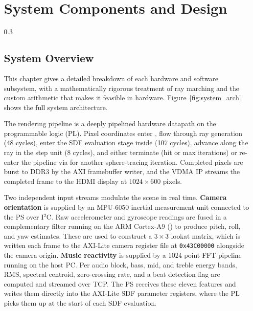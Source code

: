 \chapter{System Components and Design}
\label{ch2}

\begin{spacing}{0.3}
\minitoc
\end{spacing}

\thesisspacing


\section{System Overview}

This chapter gives a detailed breakdown of each hardware and software subsystem,
with a mathematically rigorous treatment of ray marching and the custom
arithmetic that makes it feasible in hardware. Figure~\ref{fig:system_arch}
shows the full system architecture.

The rendering pipeline is a deeply pipelined hardware datapath on the
programmable logic (PL). Pixel coordinates enter , flow
through ray generation (48 cycles), enter the SDF evaluation stage inside
 (107 cycles), advance along the ray in the step unit (8
cycles), and either terminate (hit or max iterations) or re-enter the pipeline
via  for another sphere-tracing iteration. Completed pixels
are burst to DDR3 by the AXI framebuffer writer, and the VDMA IP streams the
completed frame to the HDMI display at $1024\times600$ pixels.

Two independent input streams modulate the scene in real time. \textbf{Camera
orientation} is supplied by an MPU-6050 inertial measurement unit connected to
the PS over I$^2$C. Raw accelerometer and gyroscope readings are fused in a
complementary filter running on the ARM Cortex-A9 () to produce
pitch, roll, and yaw estimates. These are used to construct a $3\times3$ lookat
matrix, which is written each frame to the AXI-Lite camera register file at
\texttt{0x43C00000} alongside the camera origin. \textbf{Music reactivity} is
supplied by a 1024-point FFT pipeline running on the host PC. Per audio block,
bass, mid, and treble energy bands, RMS, spectral centroid, zero-crossing rate,
and a beat detection flag are computed and streamed over TCP. The PS receives
these eleven features and writes them directly into the AXI-Lite SDF parameter
registers, where the PL picks them up at the start of each SDF evaluation.


